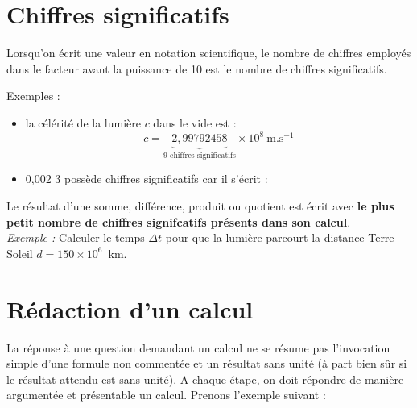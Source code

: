 \section{Chiffres significatifs}

\begin{tcolorbox}
[colback=green!5!white,colframe=green!75!black,title=\textbf{Chiffre significatif}]
Lorsqu’on écrit une valeur en notation scientifique, le nombre de chiffres employés dans le facteur avant la puissance de 10 est le nombre de chiffres significatifs.\\
\end{tcolorbox}
Exemples : 
\begin{itemize}
    \item la célérité de la lumière $c$ dans le vide est :
\begin{equation*}
    c =\underbrace{2,99 792458}_{\text{9 chiffres significatifs}}\times 10^8~\text{m.s}^{-1}
\end{equation*}
\item 0,002 3 possède  chiffres significatifs car il s'écrit : 
\end{itemize}

\begin{tcolorbox}[colback=red!5!white,colframe=red!75!black,title=Règles à retenir sur les chiffres significatifs]
Le résultat d'une somme, différence, produit ou quotient est écrit avec \textbf{le plus petit nombre de chiffres signifcatifs présents dans son calcul}.\\
\textit{Exemple : } Calculer le temps $\Delta t$ pour que la lumière parcourt la distance Terre-Soleil $d=150\times 10^{6}$~km.
\newline
\newline
\newline
\newline
\newline
\newline
\end{tcolorbox}


\section{Rédaction d'un calcul}
La réponse à une question demandant un calcul ne se résume pas l'invocation simple d'une formule non commentée et un résultat sans unité (à part bien sûr si le résultat attendu est sans unité). A chaque étape, on doit répondre de manière argumentée et présentable un calcul. Prenons l'exemple suivant : 

